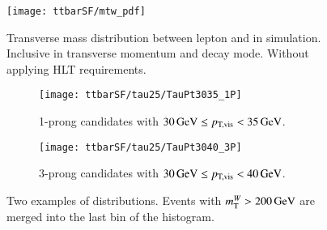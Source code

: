 




\begin{figure}[htbp]
  \centering

  \texttt{[image: ttbarSF/mtw\_pdf]}

  \caption{Transverse mass distribution between lepton and \pTmiss in
    \ttbar simulation. Inclusive in \tauhadvis transverse momentum and
    decay mode. Without applying HLT requirements.}
  \label{fig:ttbarsf_mtw_pdf}
\end{figure}











\begin{figure}[htbp]
  \centering

  \begin{subfigure}{.485\textwidth}
    \texttt{[image: ttbarSF/tau25/TauPt3035\_1P]}
    \caption{1-prong \tauhadvis candidates with
      $\SI{30}{\ensuremath{\text{GeV}}} \leq p_\text{T,vis} < \SI{35}{\ensuremath{\text{GeV}}}$.}
  \end{subfigure}\hfill%
  \begin{subfigure}{.485\textwidth}
    \texttt{[image: ttbarSF/tau25/TauPt3040\_3P]}
    \caption{3-prong \tauhadvis candidates with
      $\SI{30}{\GeV} \leq \pTvis < \SI{40}{\GeV}$.}
  \end{subfigure}

  \caption{Two examples of \mTW distributions. Events with
    $m_{\text{T}}^W > \SI{200}{\ensuremath{\text{GeV}}}$ are merged into the last bin of the
    histogram.}
  \label{fig:ttbarsf_mtw_examples_prefit}
\end{figure}




